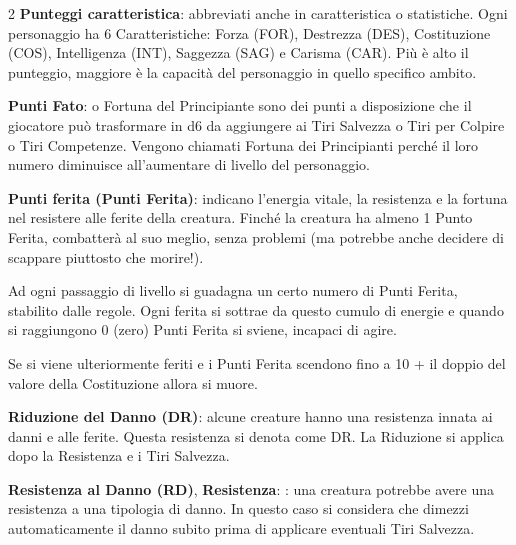 \begin{multicols}{2}
\textbf{Punteggi caratteristica}:   abbreviati anche in caratteristica o statistiche. Ogni personaggio ha 6 Caratteristiche: Forza (FOR), Destrezza (DES), Costituzione (COS), Intelligenza (INT), Saggezza (SAG) e Carisma (CAR). Più è alto il punteggio, maggiore è la capacità del personaggio in quello specifico ambito.

\textbf{Punti Fato}: o Fortuna del Principiante sono dei punti a disposizione che il giocatore può trasformare in d6 da aggiungere ai Tiri Salvezza o Tiri per Colpire o Tiri Competenze. Vengono chiamati Fortuna dei Principianti perché il loro numero diminuisce all'aumentare di livello del personaggio.

\textbf{Punti ferita (Punti Ferita)}: indicano l'energia vitale, la resistenza e la fortuna nel resistere alle ferite della creatura. Finché la creatura ha almeno 1 Punto Ferita, combatterà al suo meglio, senza problemi (ma potrebbe anche decidere di scappare piuttosto che morire!).

\begin{figure}

	\centering
\end{figure}

Ad ogni passaggio di livello si guadagna un certo numero di Punti Ferita, stabilito dalle regole. Ogni ferita si sottrae da questo cumulo di energie e quando si raggiungono 0 (zero) Punti Ferita si sviene, incapaci di agire.

%

Se si viene ulteriormente feriti e i Punti Ferita scendono fino a 10 + il doppio del valore della Costituzione allora si muore.

\textbf{Riduzione del Danno (DR)}:   alcune creature hanno una resistenza innata ai danni e alle ferite. Questa resistenza si denota come DR. La Riduzione si applica dopo la Resistenza e i Tiri Salvezza.

\textbf{Resistenza al Danno (RD)}, \textbf{Resistenza}: : una creatura potrebbe avere una resistenza a una tipologia di danno. In questo caso si considera che dimezzi automaticamente il danno subito prima di applicare eventuali Tiri Salvezza.


\end{multicols}
